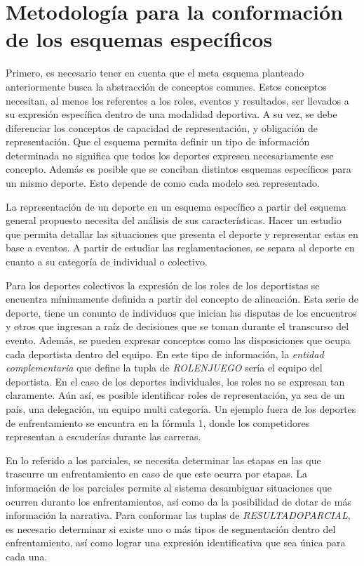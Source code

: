 \section{Metodología para la conformación de los esquemas específicos}

    Primero, es necesario tener en cuenta que el meta esquema planteado anteriormente busca la abstracción de conceptos comunes. Estos 
conceptos necesitan, al menos los referentes a los roles, eventos y resultados, ser llevados a su expresión específica dentro de una modalidad 
deportiva. A su vez, se debe diferenciar los conceptos de capacidad de representación, y obligación de representación. Que el esquema permita definir 
un tipo de información determinada no significa que todos los deportes expresen necesariamente ese concepto. Además es posible que se conciban distintos 
esquemas específicos para un mismo deporte. Esto depende de como cada modelo sea representado.

    La representación de un deporte en un esquema específico a partir del esquema general propuesto necesita del análisis de sus características. 
Hacer un estudio que permita detallar las situaciones que presenta el deporte y representar estas en base a eventos. A partir de 
estudiar las reglamentaciones, se separa al deporte en cuanto a su categoría de individual o colectivo. 

    Para los deportes colectivos la expresión de los roles de los deportistas se encuentra mínimamente definida a partir del concepto de 
alineación. Esta serie de deporte, tiene un conunto de individuos que inician las disputas de los encuentros y otros que ingresan a raíz de decisiones 
que se toman durante el transcurso del evento. Además, se pueden expresar conceptos como las disposiciones que ocupa cada deportista dentro del equipo. En este 
tipo de información, la \textit{entidad complementaria} que define la tupla de \textit{ROLENJUEGO} sería el equipo del deportista.
    En el caso de los deportes individuales, los roles no se expresan tan claramente. Aún así, es posible identificar roles de representación, ya sea de un 
país, una delegación, un equipo multi categoría. Un ejemplo fuera de los deportes de enfrentamiento se encuntra en la fórmula 1, donde los competidores 
representan a escuderías durante las carreras.

    En lo referido a los parciales, se necesita determinar las etapas en las que trascurre un enfrentamiento en caso de que este ocurra por etapas. La información 
de los parciales permite al sistema desambiguar situaciones que ocurren duranto los enfrentamientos, así como da la posibilidad de dotar de más información 
la narrativa. Para conformar las tuplas de \textit{RESULTADOPARCIAL}, es necesario determinar si existe uno o m\'as tipos de segmentación dentro del enfrentamiento, así como 
lograr una expresión identificativa que sea única para cada una.

